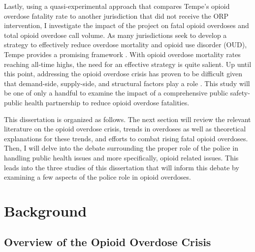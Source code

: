 Lastly, using a quasi-experimental approach that compares Tempe’s opioid overdose fatality rate to another jurisdiction that did not receive the ORP intervention, I investigate the impact of the project on fatal opioid overdoses and total opioid overdose call volume. As many jurisdictions seek to develop a strategy to effectively reduce overdose mortality and opioid use disorder (OUD), Tempe provides a promising framework \parencite{white_moving_2021}. With opioid overdose mortality rates reaching all-time highs, the need for an effective strategy is quite salient. Up until this point, addressing the opioid overdose crisis has proven to be difficult given that demand-side, supply-side, and structural factors play a role \parencite{feldmeyer_community_2022}. This study will be one of only a handful to examine the impact of a comprehensive public safety-public health partnership to reduce opioid overdose fatalities.

This dissertation is organized as follows. The next section will review the relevant literature on the opioid overdose crisis, trends in overdoses as well as theoretical explanations for these trends, and efforts to combat rising fatal opioid overdoses. Then, I will delve into the debate surrounding the proper role of the police in handling public health issues and more specifically, opioid related issues. This leads into the three studies of this dissertation that will inform this debate by examining a few aspects of the police role in opioid overdoses. %


\section{Background}
\subsection{Overview of the Opioid Overdose Crisis}

